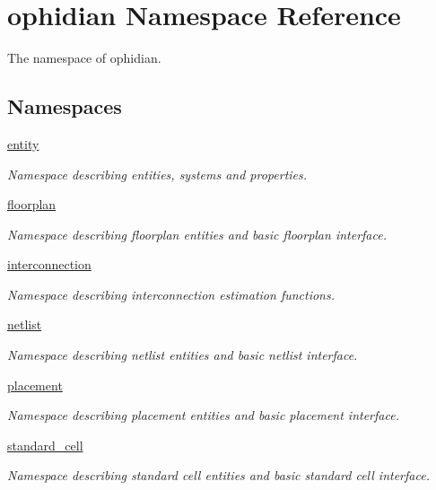 \hypertarget{namespaceophidian}{\section{ophidian Namespace Reference}
\label{namespaceophidian}
}


The namespace of ophidian.  


\subsection*{Namespaces}
\begin{DoxyCompactItemize}
\item 
\hyperlink{namespaceophidian_1_1entity}{entity}
\begin{DoxyCompactList}\small\item\em Namespace describing entities, systems and properties. \end{DoxyCompactList}\item 
\hyperlink{namespaceophidian_1_1floorplan}{floorplan}
\begin{DoxyCompactList}\small\item\em Namespace describing floorplan entities and basic floorplan interface. \end{DoxyCompactList}\item 
\hyperlink{namespaceophidian_1_1interconnection}{interconnection}
\begin{DoxyCompactList}\small\item\em Namespace describing interconnection estimation functions. \end{DoxyCompactList}\item 
\hyperlink{namespaceophidian_1_1netlist}{netlist}
\begin{DoxyCompactList}\small\item\em Namespace describing netlist entities and basic netlist interface. \end{DoxyCompactList}\item 
\hyperlink{namespaceophidian_1_1placement}{placement}
\begin{DoxyCompactList}\small\item\em Namespace describing placement entities and basic placement interface. \end{DoxyCompactList}\item 
\hyperlink{namespaceophidian_1_1standard__cell}{standard\-\_\-cell}
\begin{DoxyCompactList}\small\item\em Namespace describing standard cell entities and basic standard cell interface. \end{DoxyCompactList}\end{DoxyCompactItemize}
